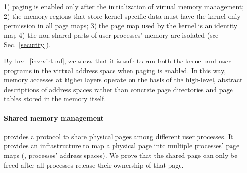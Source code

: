 \begin{invariant}
\label{inv:virtual}
1) paging is enabled only after the initialization of virtual memory management;
2) the memory regions that store kernel-specific data must have the kernel-only 
permission in all page maps;
3) the page map used by the kernel is an identity map
4) the non-shared parts of user processes' memory are isolated (see 
Sec.~\ref{security}).
\end{invariant}


By Inv.~\ref{inv:virtual}, we show that it is safe to
run both the kernel and user programs in the virtual 
address space when paging is enabled.
In this way, memory accesses at higher layers
operate on the basis of
the high-level, abstract descriptions of address spaces
rather than concrete page directories and page tables stored in the memory
itself.


\vspace{-3pt}
\paragraph{Shared memory management} provides a protocol to share physical
pages among different user processes. 
It provides an infrastructure to map a physical page into multiple
processes' page maps (\ie, processes' address spaces).
We prove that the shared page can only be freed after 
all processes release their ownership of that page.




\ignore{\begin{figure}
 = C, multicols=1] {source_code/enqueue.v}
\vspace{-5pt}
\caption{Specifications of local queue operations.}
\label{fig:exp:queue}
\vspace{-10pt}
\end{figure}}


